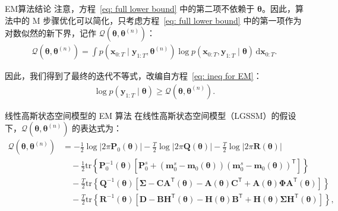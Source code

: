 \documentclass[presentation,aspectratio=169]{ctexbeamer}
\begin{document}
\begin{frame}{EM算法结论}
注意，方程~\eqref{eq: full lower bound} 中的第二项不依赖于 \(\boldsymbol{\theta}\)。因此，算法中的 M 步骤优化可以简化，只考虑方程~\eqref{eq: full lower bound} 中的第一项作为对数似然的新下界，记作 \(\mathcal{Q}(\boldsymbol{\theta}, \boldsymbol{\theta}^{(n)})\)：
\begin{align}
\mathcal{Q}(\boldsymbol{\theta}, \boldsymbol{\theta}^{(n)}) = \int p(\mathbf{x}_{0:T} \mid \mathbf{y}_{1:T}, \boldsymbol{\theta}^{(n)}) \log p(\mathbf{x}_{0:T}, \mathbf{y}_{1:T} \mid \boldsymbol{\theta}) \, \mathrm{d} \mathbf{x}_{0:T}.
\end{align}
\pause

因此，我们得到了最终的迭代不等式，改编自方程~\eqref{eq: ineq for EM}：
\begin{align}
    \log p(\mathbf{y}_{1:T} \mid \boldsymbol{\theta}) \ge \mathcal{Q}(\boldsymbol{\theta}, \boldsymbol{\theta}^{(n)}). \label{eq: ineq for EM final}
\end{align}
\end{frame}

\begin{frame}{线性高斯状态空间模型的 EM 算法}
在线性高斯状态空间模型（LGSSM）的假设下，\(\mathcal{Q}(\boldsymbol{\theta}, \boldsymbol{\theta}^{(n)})\) 的表达式为：
\begin{align}
    \mathcal{Q}(\boldsymbol{\theta}, \boldsymbol{\theta}^{(n)}) &= -\frac{1}{2} \log |2\pi \mathbf{P}_0(\boldsymbol{\theta})| - \frac{T}{2} \log |2\pi \mathbf{Q}(\boldsymbol{\theta})| - \frac{T}{2} \log |2\pi \mathbf{R}(\boldsymbol{\theta})| \nonumber \\
    &\quad - \frac{1}{2} \mathrm{tr} \left\{ \mathbf{P}_0^{-1}(\boldsymbol{\theta}) \left[ \mathbf{P}_0^s + (\mathbf{m}_0^s - \mathbf{m}_0(\boldsymbol{\theta}))(\mathbf{m}_0^s - \mathbf{m}_0(\boldsymbol{\theta}))^\mathsf{T} \right] \right\} \nonumber \\
    &\quad - \frac{T}{2} \mathrm{tr} \left\{ \mathbf{Q}^{-1}(\boldsymbol{\theta}) \left[ \boldsymbol{\Sigma} - \mathbf{C} \mathbf{A}^\mathsf{T}(\boldsymbol{\theta}) - \mathbf{A}(\boldsymbol{\theta}) \mathbf{C}^\mathsf{T} + \mathbf{A}(\boldsymbol{\theta}) \boldsymbol{\Phi} \mathbf{A}^\mathsf{T}(\boldsymbol{\theta}) \right] \right\} \nonumber \\
    &\quad - \frac{T}{2} \mathrm{tr} \left\{ \mathbf{R}^{-1}(\boldsymbol{\theta}) \left[ \mathbf{D} - \mathbf{B} \mathbf{H}^\mathsf{T}(\boldsymbol{\theta}) - \mathbf{H}(\boldsymbol{\theta}) \mathbf{B}^\mathsf{T} + \mathbf{H}(\boldsymbol{\theta}) \boldsymbol{\Sigma} \mathbf{H}^\mathsf{T}(\boldsymbol{\theta}) \right] \right\}, \label{eq: Q for LGSSM}
\end{align}
\end{frame}
\end{document}
